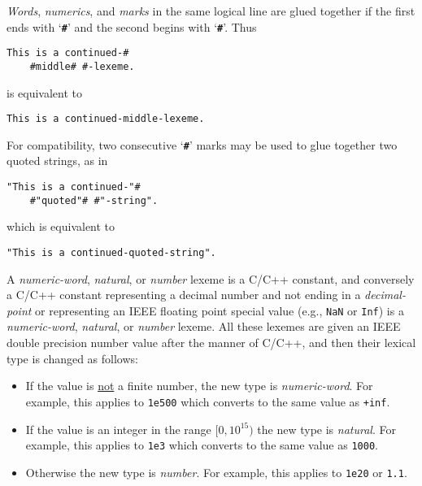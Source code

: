 \documentclass[12pt]{article}
\newcommand{\TT}[1]{{\tt \bfseries #1}}
\newenvironment{indpar}[1][0.3in]%
	{\begin{list}{}%
		     {\setlength{\itemsep}{0in}%
		      \setlength{\topsep}{0in}%
		      \setlength{\parsep}{1ex}%
		      \setlength{\labelwidth}{#1}%
		      \setlength{\leftmargin}{#1}%
		      \addtolength{\leftmargin}{\labelsep}}%
	 \item}%
	{\end{list}}
\begin{document}
{\em Words}, {\em numerics}, and {\em marks}
in the same logical line are glued together if the first
ends with `\TT{\#}' and the second begins with `\TT{\#}'.
Thus
\begin{indpar}\begin{verbatim}
This is a continued-#
    #middle# #-lexeme.
\end{verbatim}\end{indpar}
is equivalent to
\begin{indpar}\begin{verbatim}
This is a continued-middle-lexeme.
\end{verbatim}\end{indpar}
For compatibility, two consecutive `\TT{\#}' marks may be used
to glue together two quoted strings, as in
\begin{indpar}\begin{verbatim}
"This is a continued-"#
    #"quoted"# #"-string".
\end{verbatim}\end{indpar}
which is equivalent to
\begin{indpar}\begin{verbatim}
"This is a continued-quoted-string".
\end{verbatim}\end{indpar}


A {\em numeric-word}, {\em natural}, or {\em number} lexeme
is a C/C++ constant, and 
conversely a C/C++ constant representing a decimal number
and not ending in a {\em decimal-point} or representing an
IEEE floating point special value (e.g., {\tt NaN} or {\tt Inf})
is a {\em numeric-word}, {\em natural}, or {\em number} lexeme.
All these lexemes are given an IEEE double precision number value
after the manner of C/C++, and then their lexical type is changed
as follows:
\begin{itemize}\label{LEXEME-TYPE-CONVERSION}
\item If the value is \underline{not} a finite number, the
new type is {\em numeric-word}.  For example, this applies to {\tt 1e500}
which converts to the same value as {\tt +inf}.
\item If the value is an integer in the range $[0,10^{15})$ the new
type is {\em natural}.
For example, this applies to {\tt 1e3}
which converts to the same value as {\tt 1000}.
\item Otherwise the new type is {\em number}.
For example, this applies to {\tt 1e20} or {\tt 1.1}.
\end{itemize}
\end{document}
